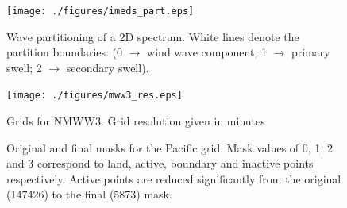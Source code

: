 \documentclass[12pt]{article}
\begin{document}






{}
{\clearpage}




\begin{figure}[t]
\noindent\texttt{[image: ./figures/imeds\_part.eps]}
\caption{Wave partitioning of a 2D spectrum. White lines denote the partition boundaries. (0 $\rightarrow$ wind wave component; 1 $\rightarrow$ primary swell; 2 $\rightarrow$ secondary swell).}
\label{fig:imeds_part} 
\end{figure}

\begin{figure}[t]
\noindent\texttt{[image: ./figures/mww3\_res.eps]}
\caption{Grids for NMWW3. Grid resolution given in minutes}
\label{fig:grids}
\end{figure}

\begin{figure}[t]
\hspace*{0.5in} 
\caption{Original and final masks for the Pacific grid. Mask values of
0, 1, 2 and 3 correspond to land, active, boundary and inactive points
respectively. Active points are reduced significantly from the
original (147426) to the final (5873) mask.}
\label{fig:wnp_mask} 
\end{figure}
\end{document}
